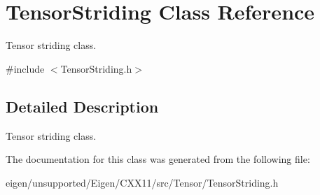 \hypertarget{class_tensor_striding}{}\section{Tensor\+Striding Class Reference}
\label{class_tensor_striding}


Tensor striding class.  




{\ttfamily \#include $<$Tensor\+Striding.\+h$>$}



\subsection{Detailed Description}
Tensor striding class. 

The documentation for this class was generated from the following file\+:\begin{DoxyCompactItemize}
\item 
eigen/unsupported/\+Eigen/\+C\+X\+X11/src/\+Tensor/\+Tensor\+Striding.\+h\end{DoxyCompactItemize}
